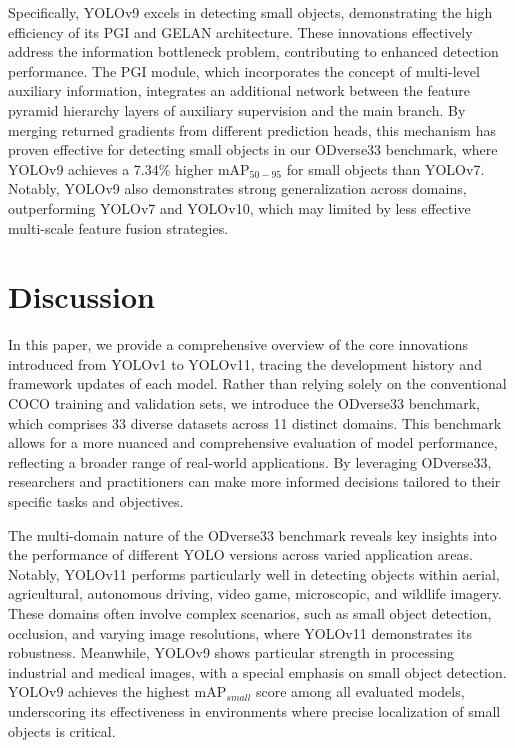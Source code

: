\documentclass[runningheads]{llncs}
\begin{document}
Specifically, YOLOv9 excels in detecting small objects, demonstrating the high efficiency of its PGI and GELAN architecture. These innovations effectively address the information bottleneck problem, contributing to enhanced detection performance. The PGI module, which incorporates the concept of multi-level auxiliary information, integrates an additional network between the feature pyramid hierarchy layers of auxiliary supervision and the main branch. By merging returned gradients from different prediction heads, this mechanism has proven effective for detecting small objects in our ODverse33 benchmark, where YOLOv9 achieves a 7.34\% higher mAP$_{50-95}$ for small objects than YOLOv7. Notably, YOLOv9 also demonstrates strong generalization across domains, outperforming YOLOv7 and YOLOv10, which may limited by less effective multi-scale feature fusion strategies. 



\section{Discussion}
In this paper, we provide a comprehensive overview of the core innovations introduced from YOLOv1 to YOLOv11, tracing the development history and framework updates of each model. Rather than relying solely on the conventional COCO training and validation sets, we introduce the ODverse33 benchmark, which comprises 33 diverse datasets across 11 distinct domains. This benchmark allows for a more nuanced and comprehensive evaluation of model performance, reflecting a broader range of real-world applications. By leveraging ODverse33, researchers and practitioners can make more informed decisions tailored to their specific tasks and objectives. 

The multi-domain nature of the ODverse33 benchmark reveals key insights into the performance of different YOLO versions across varied application areas. Notably, YOLOv11 performs particularly well in detecting objects within aerial, agricultural, autonomous driving, video game, microscopic, and wildlife imagery. These domains often involve complex scenarios, such as small object detection, occlusion, and varying image resolutions, where YOLOv11 demonstrates its robustness. Meanwhile, YOLOv9 shows particular strength in processing industrial and medical images, with a special emphasis on small object detection. YOLOv9 achieves the highest mAP$_{small}$ score among all evaluated models, underscoring its effectiveness in environments where precise localization of small objects is critical.
\end{document}
